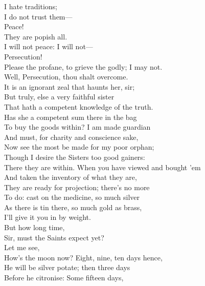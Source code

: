 \documentclass[a4paper,oneside,12pt]{memoir}
\begin{document}
\begin{drama*}
\persecutionspeaks {} I hate traditions;\\
I do not trust them---\\
\tribulationspeaks {} Peace!\\
\persecutionspeaks {} They are popish all.\\
I will not peace: I will not---\\
\tribulationspeaks {} Persecution!\\
\persecutionspeaks Please the profane, to grieve the godly; I may not.\\
\subtlespeaks Well, Persecution, thou shalt overcome.\\
\tribulationspeaks It is an ignorant zeal that haunts her, sir;\\
But truly, else a very faithful sister\\
That hath a competent knowledge of the truth.\\
\subtlespeaks Has she a competent sum there in the bag\\
To buy the goods within? I am made guardian\\
And must, for charity and conscience sake,\\
Now see the most be made for my poor orphan;\\
Though I desire the Sisters too good gainers:\\
There they are within. When you have viewed and bought 'em\\
And taken the inventory of what they are,\\
They are ready for projection; there's no more\\
To do: cast on the medicine, so much silver\\
As there is tin there, so much gold as brass,\\
I'll give it you in by weight.\\
\tribulationspeaks {} But how long time,\\
Sir, must the Saints expect yet?\\
\subtlespeaks {} Let me see,\\
How's the moon now? Eight, nine, ten days hence,\\
He will be silver potate; then three days\\
Before he citronise: Some fifteen days,\\

\end{drama*}
\end{document}
